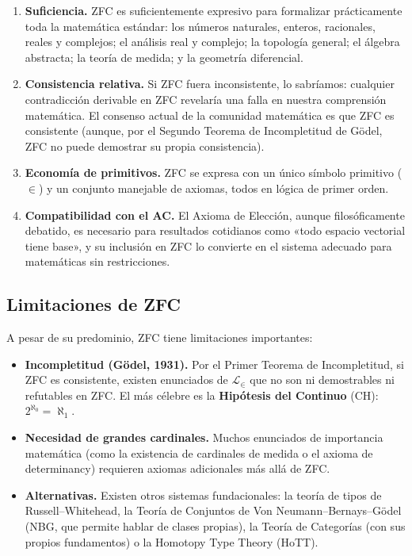 \begin{enumerate}[leftmargin=2em, label=\textbf{\arabic*.}]
  \item \textbf{Suficiencia.} ZFC es suficientemente expresivo para formalizar prácticamente toda la matemática estándar: los números naturales, enteros, racionales, reales y complejos; el análisis real y complejo; la topología general; el álgebra abstracta; la teoría de medida; y la geometría diferencial.

  \item \textbf{Consistencia relativa.} Si ZFC fuera inconsistente, lo sabríamos: cualquier contradicción derivable en ZFC revelaría una falla en nuestra comprensión matemática. El consenso actual de la comunidad matemática es que ZFC es consistente (aunque, por el Segundo Teorema de Incompletitud de Gödel, ZFC no puede demostrar su propia consistencia).

  \item \textbf{Economía de primitivos.} ZFC se expresa con un único símbolo primitivo ($\in$) y un conjunto manejable de axiomas, todos en lógica de primer orden.

  \item \textbf{Compatibilidad con el AC.} El Axioma de Elección, aunque filosóficamente debatido, es necesario para resultados cotidianos como «todo espacio vectorial tiene base», y su inclusión en ZFC lo convierte en el sistema adecuado para matemáticas sin restricciones.
\end{enumerate}

\subsection{Limitaciones de ZFC}

A pesar de su predominio, ZFC tiene limitaciones importantes:

\begin{itemize}[leftmargin=2em]
  \item \textbf{Incompletitud (Gödel, 1931).} Por el Primer Teorema de Incompletitud, si ZFC es consistente, existen enunciados de $\mathcal{L}_{\in}$ que no son ni demostrables ni refutables en ZFC. El más célebre es la \textbf{Hipótesis del Continuo} (CH): $2^{\aleph_0} = \aleph_1$.

  \item \textbf{Necesidad de grandes cardinales.} Muchos enunciados de importancia matemática (como la existencia de cardinales de medida o el axioma de determinancy) requieren axiomas adicionales más allá de ZFC.

  \item \textbf{Alternativas.} Existen otros sistemas fundacionales: la teoría de tipos de Russell–Whitehead, la Teoría de Conjuntos de Von Neumann–Bernays–Gödel (NBG, que permite hablar de clases propias), la Teoría de Categorías (con sus propios fundamentos) o la Homotopy Type Theory (HoTT).
\end{itemize}

